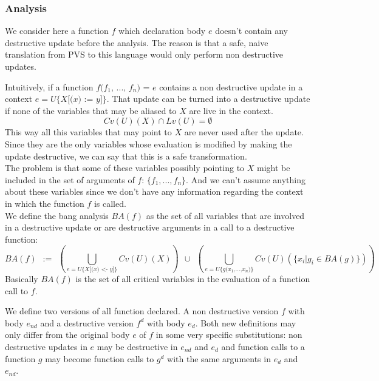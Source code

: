 \documentclass[12pt,a4paper]{article}
\newcommand{\cl}[1]{\texttt{#1}}
\newcommand{\ucont}[1]{\{#1\}}
\begin{document}
\subsubsection{Analysis}

We consider here a function $f$ which declaration body $e$ doesn't contain any destructive update before the analysis. The reason is that a safe, naive translation from PVS to this language would only perform non destructive updates.

Intuitively, if a function $f\cl{(}f_1\cl{, } ... \cl{, } f_n\cl{) = } e$ contains a non destructive update in a context $e = U\ucont{X\cl{[(}x\cl{) := }y\cl{]}}$. That update can be turned into a destructive update if none of the variables that may be aliased to $X$ are live in the context.
$$ Cv(U)(X) \cap Lv(U) = \emptyset $$
This way all this variables that may point to $X$ are never used after the update. Since they are the only variables whose evaluation is modified by making the update destructive, we can say that this is a safe transformation.\\

The problem is that some of these variables possibly pointing to $X$ might be included in the set of arguments of $f$: $\{f_1, ... , f_n\}$. And we can't assume anything about these variables since we don't have any information regarding the context in which the function $f$ is called.\\

We define the bang analysis $BA(f)$ as the set of all variables that are involved in a destructive update or are destructive arguments in a call to a destructive function:
$$ BA(f) \ \ := \ \ \left( \bigcup_{e = U\ucont{X\cl{[(}x \cl{) <- } y \cl{]} }}  Cv(U)(X) \right) \ \ \cup \ \ \left( \bigcup_{e = U\ucont{g\cl{(} x_1\cl{,} ... \cl{,} x_n \cl{)}}} Cv(U)( \{ x_i | g_i \in BA(g) \}) \right)$$
Basically $BA(f)$ is the set of all critical variables in the evaluation of a function call to $f$.

We define two versions of all function declared. A non destructive version $f$ with body $e_{nd}$ and a destructive version $f^d$ with body $e_d$.
Both new definitions may only differ from the original body $e$ of $f$ in some very specific substitutions: non destructive updates in $e$ may be destructive in $e_{nd}$ and $e_d$ and function calls to a function $g$ may become function calls to $g^d$ with the same arguments in $e_d$ and $e_{nd}$.\\
\end{document}
